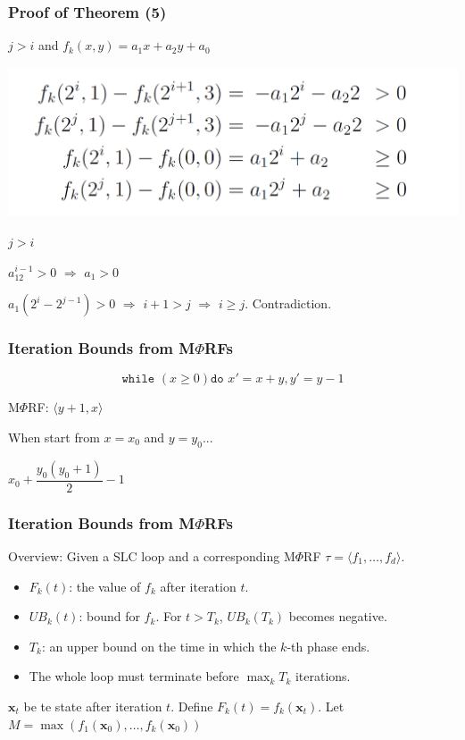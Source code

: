 \documentclass[11pt]{beamer}
\begin{document}
\begin{frame}\frametitle{Proof of Theorem (5)}
$j > i$ and $f_k(x, y) = a_1 x + a_2 y + a_0$
\begin{center}
\includegraphics[scale = 0.3]{9.PNG}
\end{center}
$j > i$

$a_12^{i - 1} > 0$ $\Rightarrow$ $a_1 > 0$

$a_1 (2^{i} - 2^{j - 1}) > 0$ $\Rightarrow$ $i + 1 > j$ $\Rightarrow$ $i \ge j$. Contradiction.




\end{frame}

\begin{frame}\frametitle{Iteration Bounds from M$\Phi$RFs}
\begin{example}
\[\texttt{while }(x \ge 0)\texttt{do } x'= x + y, y' = y - 1\]
\end{example}
M$\Phi$RF: $\langle y + 1, x \rangle $

When start from $x = x_0$ and $y = y_0$...

$x_0 + \dfrac{y_0(y_0 + 1)}{2} - 1$
\end{frame}

\begin{frame}\frametitle{Iteration Bounds from M$\Phi$RFs}
Overview:
Given a SLC loop and a corresponding M$\Phi$RF $\tau = \langle f_1, \ldots, f_d\rangle$.
\begin{itemize}
\item $F_k(t)$: the value of $f_k$ after iteration $t$.

\item $UB_k(t)$: bound for $f_k$. For $t > T_k$, $UB_k(T_k)$ becomes negative.

\item $T_k$: an upper bound on the time in which the $k$-th phase ends.

\item The whole loop must terminate before $\max_kT_k$ iterations.
\end{itemize}

$\textbf{x}_t$ be te state after iteration $t$. Define $F_k(t) = f_k(\textbf{x}_t)$. Let $M = \max(f_1(\textbf{x}_0), \ldots, f_k(\textbf{x}_0))$ 

\end{frame}
\end{document}
